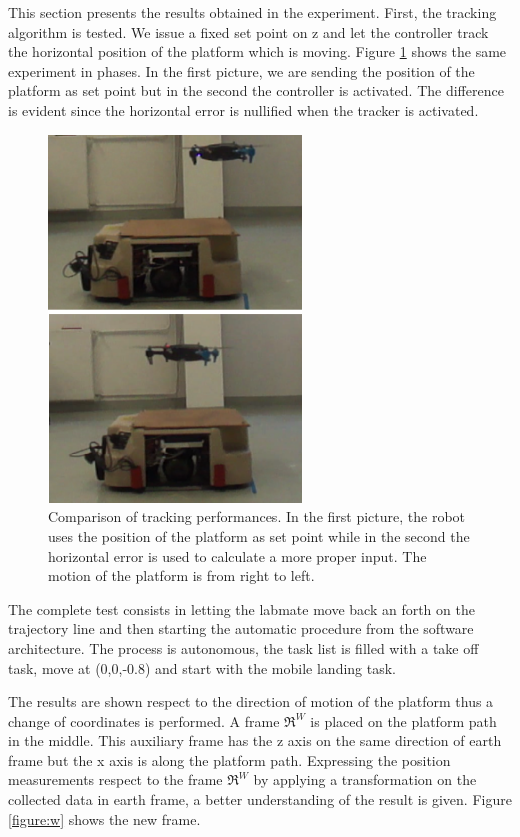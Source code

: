 This section presents the results obtained in the experiment. First, the tracking algorithm is tested. We issue a fixed set point on z and let the controller track the horizontal position of the platform which is moving. Figure \ref{figure:track} shows the same experiment in phases. In the first picture, we are sending the position of the platform as set point but in the second the controller is activated. The difference is evident since the horizontal error is nullified when the tracker is activated. 
\begin{figure}[H]
 \centering
   \includegraphics[width = 0.6\textwidth ]{trackcompare.png}
    \caption[Tracking comparison]{Comparison of tracking performances. In the first picture, the robot uses the position of the platform as set point while in the second the horizontal error is used to calculate a more proper input. The motion of the platform is from right to left. }
   \label{figure:track}
\end{figure}

\noindent
The complete test consists in letting the labmate move back an forth on the trajectory line and then starting the automatic procedure from the software architecture. The process is autonomous, the task list is filled with a take off task, move at (0,0,-0.8) and start with the mobile landing task. 
 
The results are shown respect to the direction of motion of the platform thus a change of coordinates is performed. A frame $\Re^W$ is placed on the platform path in the middle. This auxiliary frame has the z axis on the same direction of earth frame but the x axis is along the platform path. Expressing the position measurements respect to the frame $\Re ^W$ by applying a transformation on the collected data in earth frame, a better understanding of the result is given. Figure \ref{figure:w} shows the new frame.
 
